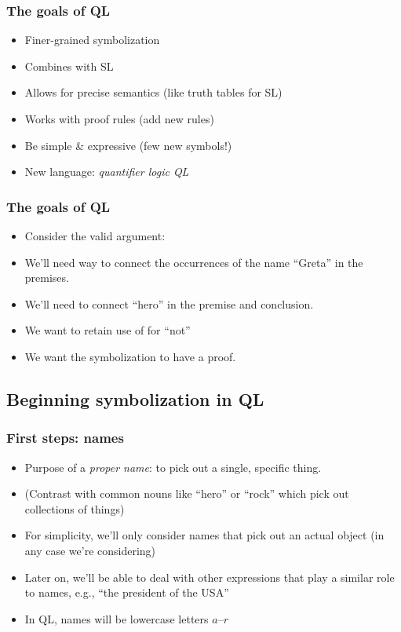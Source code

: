 \begin{frame}
  \frametitle{The goals of QL}
  \begin{itemize}[<+->]
    \item Finer-grained symbolization
    \item Combines with SL
    \item Allows for precise semantics (like truth tables for SL)
    \item Works with proof rules (add new rules)
    \item Be simple \& expressive (few new symbols!)
    \item New language: \emph{quantifier logic QL}
  \end{itemize}
\end{frame}

\begin{frame}
  \frametitle{The goals of QL}

  \begin{itemize}[<+->]
    \item Consider the valid argument:
    \item We'll need way to connect the occurrences of the name
    ``Greta'' in the premises.
    \item We'll need to connect ``hero'' in the premise and conclusion.
    \item We want to retain use of \enot{} for ``not''
    \item We want the symbolization to have a proof.
  \end{itemize}
\end{frame}

\subsection{Beginning symbolization in QL}

\begin{frame}
  \frametitle{First steps: names}

  \begin{itemize}[<+->]
    \item Purpose of a \emph{proper name}: to pick out a single, specific thing.
    \item (Contrast with common nouns like ``hero'' or ``rock'' which pick out collections of things)
    \item For simplicity, we'll only consider names that pick out an
    actual object (in any case we're considering)
    \item Later on, we'll be able to deal with other expressions that play a similar role to names, e.g., ``the president of the USA''
    \item In QL, names will be lowercase letters $a$--$r$
  \end{itemize}
\end{frame}

